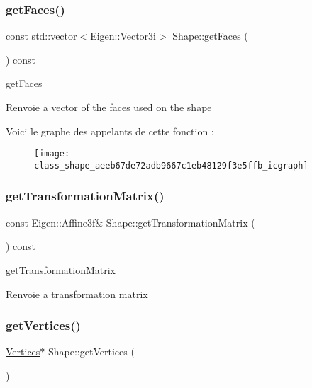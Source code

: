 \subsubsection{\texorpdfstring{get\+Faces()}{getFaces()}}
{\footnotesize\ttfamily const std\+::vector$<$Eigen\+::\+Vector3i$>$ Shape\+::get\+Faces (\begin{DoxyParamCaption}{ }\end{DoxyParamCaption}) const\hspace{0.3cm}{\ttfamily [inline]}}



get\+Faces 

\begin{DoxyReturn}{Renvoie}
a vector of the faces used on the shape 
\end{DoxyReturn}
Voici le graphe des appelants de cette fonction \+:\nopagebreak
\begin{figure}[H]
\begin{center}
\leavevmode
\texttt{[image: class\_shape\_aeeb67de72adb9667c1eb48129f3e5ffb\_icgraph]}
\end{center}
\end{figure}
\mbox{\label{class_shape_a9a1f2d5c370b8c9194fc51ea37a03cac}} 
\subsubsection{\texorpdfstring{get\+Transformation\+Matrix()}{getTransformationMatrix()}}
{\footnotesize\ttfamily const Eigen\+::\+Affine3f\& Shape\+::get\+Transformation\+Matrix (\begin{DoxyParamCaption}{ }\end{DoxyParamCaption}) const\hspace{0.3cm}{\ttfamily [inline]}}



get\+Transformation\+Matrix 

\begin{DoxyReturn}{Renvoie}
a transformation matrix 
\end{DoxyReturn}
\mbox{\label{class_shape_aacdf84a7934b19a50bf9d5b4cd122caf}} 
\subsubsection{\texorpdfstring{get\+Vertices()}{getVertices()}\hspace{0.1cm}{\footnotesize\ttfamily [1/2]}}
{\footnotesize\ttfamily \hyperlink{struct_shape_1_1_vertices}{Vertices}$\ast$ Shape\+::get\+Vertices (\begin{DoxyParamCaption}{ }\end{DoxyParamCaption})\hspace{0.3cm}{\ttfamily [inline]}}



